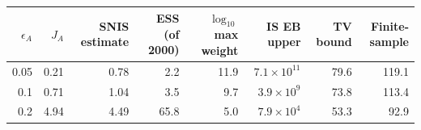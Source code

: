 \begin{tabular}{rrrrrrrr}
\toprule
 $\epsilon_A$ & $J_A$ & SNIS estimate & ESS (of 2000) & $\log_{10}$ max weight & IS EB upper & TV bound & Finite-sample \\
\midrule
0.05 & 0.21 & 0.78 & 2.2 & 11.9 & $7.1\times10^{11}$ & 79.6 & 119.1 \\
0.1 & 0.71 & 1.04 & 3.5 & 9.7 & $3.9\times10^{9}$ & 73.8 & 113.4 \\
0.2 & 4.94 & 4.49 & 65.8 & 5.0 & $7.9\times10^{4}$ & 53.3 & 92.9 \\
\bottomrule
\end{tabular}
